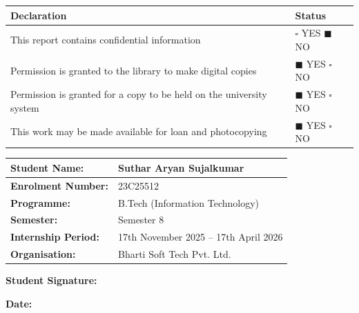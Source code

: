 \documentclass[
  12pt,
  a4paperpaper,
]{report}
\newcounter{none} %
\begin{document}
{\def\LTcaptype{none} %
\begin{longtable}[]{@{}
  >{\raggedright\arraybackslash}p{}
  >{\centering\arraybackslash}p{}@{}}
\hline
\begin{minipage}[b]{\linewidth}\raggedright
Declaration
\end{minipage} & \begin{minipage}[b]{\linewidth}\centering
Status
\end{minipage} \\
\hline
\endhead
\hline
\endlastfoot
This report contains confidential information & $\square$ YES \quad $\blacksquare$ NO \\
Permission is granted to the library to make digital copies & $\blacksquare$ YES \quad $\square$ NO \\
Permission is granted for a copy to be held on the university system & $\blacksquare$ YES \quad $\square$ NO \\
This work may be made available for loan and photocopying & $\blacksquare$ YES \quad $\square$ NO \\
\end{longtable}
}

\vspace{4pt}

\noindent\begin{tabularx}{\textwidth}{|p{5.5cm}|X|}
\hline
\textbf{Student Name:}       & Suthar Aryan Sujalkumar \\[2pt]
\hline
\textbf{Enrolment Number:}   & 23C25512 \\[2pt]
\hline
\textbf{Programme:}          & B.Tech (Information Technology) \\[2pt]
\hline
\textbf{Semester:}           & Semester 8 \\[2pt]
\hline
\textbf{Internship Period:}  & 17th November 2025 -- 17th April 2026 \\[2pt]
\hline
\textbf{Organisation:}       & Bharti Soft Tech Pvt. Ltd. \\
\hline
\end{tabularx}

\vspace{1.2cm}

\noindent
\begin{minipage}[t]{0.55\textwidth}
\textbf{Student Signature:} \underline{\hspace{2.2in}}
\end{minipage}\hfill
\begin{minipage}[t]{0.4\textwidth}
\textbf{Date:} \underline{\hspace{1.5in}}
\end{minipage}
\end{document}

